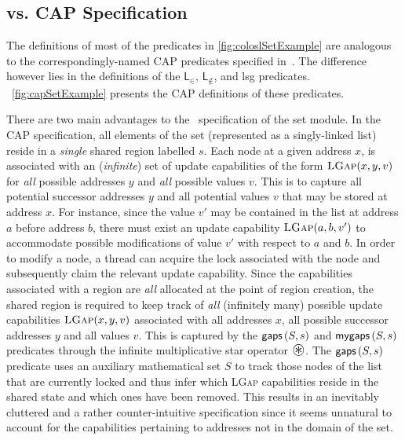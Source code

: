 %

%
%
%
%
%
%
\clearpage\subsection*{\colosl vs. CAP Specification}
The definitions of most of the predicates in \fig\ref{fig:coloslSetExample} are analogous to the correspondingly-named CAP predicates specified in~\cite{cap-ecoop10}. The difference however lies in the definitions of the $\textsf{L}_{\in}$, $\textsf{L}_{\not\in}$, and \textsf{lsg} predicates. 
\fig~\ref{fig:capSetExample} presents the CAP definitions of these predicates. 

There are two main advantages to the \colosl\ specification of the set module. In the CAP specification, all elements of the set (represented as a singly-linked list) reside in a \emph{single} shared region labelled $s$.
Each node at a given address $x$, is associated with an (\emph{infinite}) set of update capabilities of the form $\textsc{LGap}(x, y, v)$ for \emph{all} possible addresses $y$ and \emph{all} possible values $v$. This is to capture all potential successor addresses $y$ and all potential values $v$ that may be stored at address $x$. For instance, since the value $v'$ may be contained in the list at address $a$ before address $b$, there must exist an update capability $\textsc{LGap}(a, b, v')$ to accommodate possible modifications of value $v'$ with respect to $a$ and $b$. In order to modify a node, a thread can acquire the lock associated with the node and subsequently claim the relevant update capability. Since the capabilities associated with a region are \emph{all} allocated at the point of region creation, the shared region is required to keep track of \emph{all} (infinitely many) possible update capabilities $\textsc{LGap}(x, y, v)$ associated with all addresses $x$, all possible successor addresses $y$ and all values $v$. This is captured by the $\textsf{gaps}\left(S, s\right)$ and $\textsf{mygaps}\left(S, s\right)$ predicates through the infinite multiplicative star operator $\iterStar$. The $\textsf{gaps}\left(S, s\right)$ predicate uses an auxiliary mathematical set $S$ to track those nodes of the list that are currently locked and thus infer which \textsc{LGap} capabilities reside in the shared state and which ones have been removed. This results in an inevitably cluttered and a rather counter-intuitive specification since it seems unnatural to account for the capabilities pertaining to addresses not in the domain of the set. 

